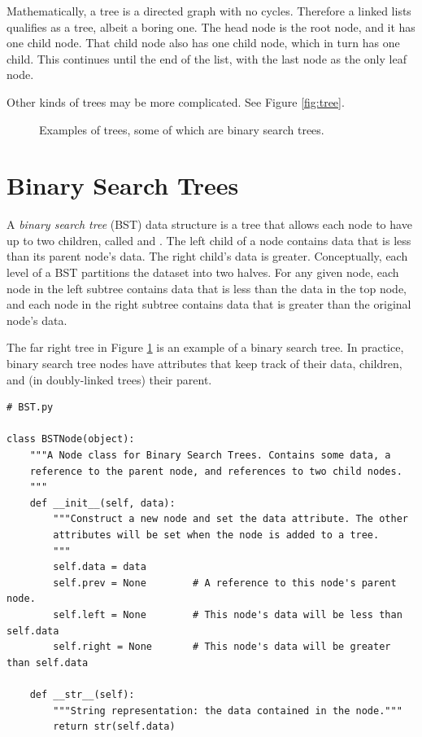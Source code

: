 Mathematically, a tree is a directed graph with no cycles.
Therefore a linked lists qualifies as a tree, albeit a boring one.
The head node is the root node, and it has one child node.
That child node also has one child node, which in turn has one child.
This continues until the end of the list, with the last node as the only leaf node.

Other kinds of trees may be more complicated.
See Figure \ref{fig:tree}.

\begin{figure}
\caption{Examples of trees, some of which are binary search trees.}
\label{fig:trees}
\end{figure}

\section*{Binary Search Trees}

A \emph{binary search tree} (BST) data structure is a tree that allows each node to have up to two children, called  and .
The left child of a node contains data that is less than its parent node's data.
The right child's data is greater.
Conceptually, each level of a BST partitions the dataset into two halves.
For any given node, each node in the left subtree contains data that is less than the data in the top node, and each node in the right subtree contains data that is greater than the original node's data.

The far right tree in Figure \ref{fig:trees} is an example of a binary search tree.
In practice, binary search tree nodes have attributes that keep track of their data, children, and (in doubly-linked trees) their parent.

\begin{lstlisting}
# BST.py

class BSTNode(object):
    """A Node class for Binary Search Trees. Contains some data, a
    reference to the parent node, and references to two child nodes.
    """
    def __init__(self, data):
        """Construct a new node and set the data attribute. The other
        attributes will be set when the node is added to a tree.
        """
        self.data = data
        self.prev = None        # A reference to this node's parent node.
        self.left = None        # This node's data will be less than self.data
        self.right = None       # This node's data will be greater than self.data
        
    def __str__(self):
        """String representation: the data contained in the node."""
        return str(self.data)
\end{lstlisting}

